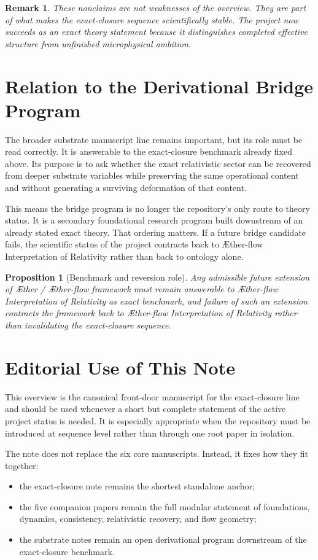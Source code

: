 \documentclass[11pt]{article}
\newcommand{\Aether}{\AE{}ther}
\newcommand{\Aflow}{\AE{}ther-flow}
\newcommand{\TheoryName}{\Aflow{} Interpretation of Relativity}
\newcommand{\TheoryProgram}{\Aether{} / \Aflow{} framework}
\newtheorem{proposition}{Proposition}
\newtheorem{remark}{Remark}
\begin{document}
\begin{remark}
These nonclaims are not weaknesses of the overview. They are part of what makes the exact-closure sequence scientifically stable. The project now succeeds as an exact theory statement because it distinguishes completed effective structure from unfinished microphysical ambition.
\end{remark}

\section{Relation to the Derivational Bridge Program}

The broader substrate manuscript line remains important, but its role must be read correctly. It is answerable to the exact-closure benchmark already fixed above. Its purpose is to ask whether the exact relativistic sector can be recovered from deeper substrate variables while preserving the same operational content and without generating a surviving deformation of that content.

This means the bridge program is no longer the repository's only route to theory status. It is a secondary foundational research program built downstream of an already stated exact theory. That ordering matters. If a future bridge candidate fails, the scientific status of the project contracts back to \TheoryName{} rather than back to ontology alone.

\begin{proposition}[Benchmark and reversion role]
Any admissible future extension of \TheoryProgram{} must remain answerable to \TheoryName{} as exact benchmark, and failure of such an extension contracts the framework back to \TheoryName{} rather than invalidating the exact-closure sequence.
\end{proposition}

\section{Editorial Use of This Note}

This overview is the canonical front-door manuscript for the exact-closure line and should be used whenever a short but complete statement of the active project status is needed. It is especially appropriate when the repository must be introduced at sequence level rather than through one root paper in isolation.

The note does not replace the six core manuscripts. Instead, it fixes how they fit together:
\begin{itemize}
    \item the exact-closure note remains the shortest standalone anchor;
    \item the five companion papers remain the full modular statement of foundations, dynamics, consistency, relativistic recovery, and flow geometry;
    \item the substrate notes remain an open derivational program downstream of the exact-closure benchmark.
\end{itemize}
\end{document}
